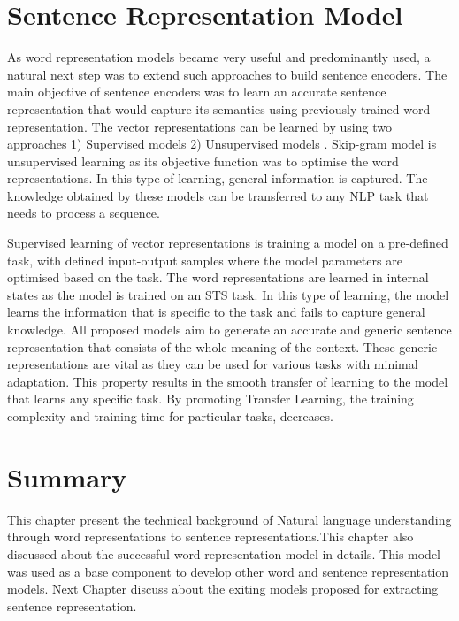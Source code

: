 \documentclass[12pt]{report} %
\begin{document}
\section{Sentence Representation Model}
As word representation models became very useful and predominantly used, a natural next step was to extend such approaches to build sentence encoders. The main objective of sentence encoders was to learn an accurate sentence representation that would capture its semantics using previously trained word representation.
The vector representations can be learned by using two approaches 1) Supervised models \citep{conneau2017supervised} 2) Unsupervised models \citep{kiros2015skip}. Skip-gram model is unsupervised learning as its objective function was to optimise the word representations. In this type of learning, general information is captured. The knowledge obtained by these models can be transferred to any NLP task that needs to process a sequence. 


Supervised learning of vector representations is training a model on a pre-defined task, with defined input-output samples where the model parameters are optimised based on the task. The word representations are learned in internal states as the model is trained on an STS task. In this type of learning, the model learns the information that is specific to the task and fails to capture general knowledge. All proposed models aim to generate an accurate and generic sentence representation that consists of the whole meaning of the context. These generic representations are vital as they can be used for various tasks with minimal adaptation. This property results in the smooth transfer of learning to the model that learns any specific task. By promoting Transfer Learning, the training complexity and training time for particular tasks, decreases.  

\section{Summary}

This chapter present the technical background of Natural language understanding through word representations to sentence representations.This chapter also discussed about the successful word representation model in details. This model was used as a base component to develop other word and sentence representation models. Next Chapter discuss about the exiting models proposed for extracting sentence representation.
\end{document}
